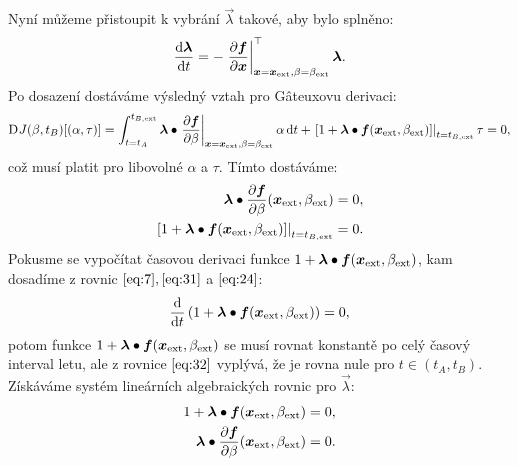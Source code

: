 \documentclass[reqno, a4paper]{amsart}
\numberwithin{equation}{section}
\begin{document}
Nyní můžeme přistoupit k vybrání $\vec{\lambda}$ takové, aby bylo splněno:
\begin{align}
  \label{eq:24}
  \frac{\mathrm{d} {\bm{\lambda}}}{\mathrm{d} {t}} = - \left. \frac{\partial {\ensuremath{\bm{f}}}}{\partial {\ensuremath{\bm{x}}}} \right|_{\bm{x} = \bm{x}_{\mathrm{ext}}, \beta = \beta_{\mathrm{ext}}}^\top \bm{\lambda}
  .
\end{align}
Po dosazení dostáváme výsledný vztah pro G\^{a}teuxovu derivaci:
\begin{equation}
  \label{eq:25}
  \Diff J(\beta, t_{B}) [(\alpha, \tau)]
  =
  \int_{t = t_{\navstart}}^{t_{\navend, \navext}}
  \vectordot{\greekvec{\lambda}}
  {
    \left. \pd{\vec{f}}{\beta} \right|_{\vec{x} = \vec{x}_{\navext}, \beta = \beta_{\navext}} \alpha
  }
  \, \diff t
  +
  \left.
    \left[
        1
        +
        \vectordot{\greekvec{\lambda}}{\vec{f}(\vec{x}_{\navext}, \beta_{\navext})}
    \right]
  \right|_{t = t_{\navend, \navext}}
  \tau =0
  ,
\end{equation}
což musí platit pro libovolné $\alpha$ a $\tau$. Tímto dostáváme:
\begin{subequations}
  \label{eq:rce2}
  \begin{align}
    \label{eq:31}
    \vectordot{\greekvec{\lambda}}
    {
    \pd{\vec{f}}{\beta}(\vec{x}_{\navext}, \beta_{\navext}) 
    }
    &=
      0, \\
    \label{eq:32}
    \left.
    \left[
    1
    +
    \vectordot{\greekvec{\lambda}}{\vec{f}(\vec{x}_{\navext}, \beta_{\navext})}
    \right]
    \right|_{t = t_{\navend, \navext}}
    &=
      0.
  \end{align}
\end{subequations} 
Pokusme se vypočítat časovou derivaci funkce $1 +  \bm{\lambda} \bullet \bm{f}(\bm{x}_{\mathrm{ext}}, \beta_{\mathrm{ext}})$, kam dosadíme z rovnic $\eqref{eq:7},\eqref{eq:31}$ a $\eqref{eq:24}$:
\begin{align}
\frac{\mathrm{d} {}}{\mathrm{d} {t}}
  \left(
    1 +  \bm{\lambda} \bullet \bm{f}(\bm{x}_{\mathrm{ext}}, \beta_{\mathrm{ext}})
  \right) = 0,
\end{align}
potom funkce $1 +  \bm{\lambda} \bullet \bm{f}(\bm{x}_{\mathrm{ext}}, \beta_{\mathrm{ext}})$ se musí rovnat konstantě po celý časový interval letu, ale z rovnice $\eqref{eq:32}$ vyplývá, že je rovna nule pro $t \in (t_{A},t_{B})$. Získáváme systém lineárních algebraických rovnic pro $\vec{\lambda}$:
\begin{subequations}
  \label{eq:40}
  \begin{align}
    \label{eq:41}
    1
    +
    \vectordot{\greekvec{\lambda}}{\vec{f}(\vec{x}_{\navext}, \beta_{\navext})}
    &=
      0
      ,
    \\
    \label{eq:42}
    \vectordot{\greekvec{\lambda}}
    {
    \pd{\vec{f}}{\beta}(\vec{x}_{\navext}, \beta_{\navext}) 
    }
    &=
      0.
  \end{align}
\end{subequations}
\end{document}
